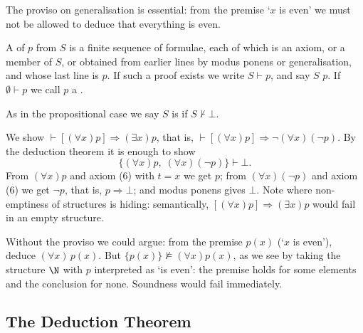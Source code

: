 The proviso on generalisation is essential: from the premise `$x$ is even' we must not be allowed to deduce that everything is even.

\begin{definition}
  A  of $p$ from $S$ is a finite sequence of formulae, each of which is an axiom, or a member of $S$, or obtained from earlier lines by modus ponens or generalisation, and whose last line is $p$. If such a proof exists we write $S \vdash p$, and say $S$  $p$. If $\emptyset \vdash p$ we call $p$ a .
\end{definition}

As in the propositional case we say $S$ is  if $S \not\vdash \bot$.

\begin{example}
  We show $\vdash [(\forall x)p] \Rightarrow (\exists x)p$, that is, $\vdash [(\forall x)p] \Rightarrow \lnot(\forall x)(\lnot p)$. By the deduction theorem it is enough to show
  $$\{(\forall x)p, \; (\forall x)(\lnot p)\} \vdash \bot.$$
  From $(\forall x) p$ and axiom (6) with $t = x$ we get $p$; from $(\forall x)(\lnot p)$ and axiom (6) we get $\lnot p$, that is, $p \Rightarrow \bot$; and modus ponens gives $\bot$. Note where non-emptiness of structures is hiding: semantically, $[(\forall x)p] \Rightarrow (\exists x)p$ would fail in an empty structure.
\end{example}

\begin{example}
  Without the proviso we could argue: from the premise $p(x)$ (`$x$ is even'), deduce $(\forall x)\,p(x)$. But $\{p(x)\} \not\models (\forall x)p(x)$, as we see by taking the structure $\N$ with $p$ interpreted as `is even': the premise holds for some elements and the conclusion for none. Soundness would fail immediately.
\end{example}

\subsection{The Deduction Theorem}

